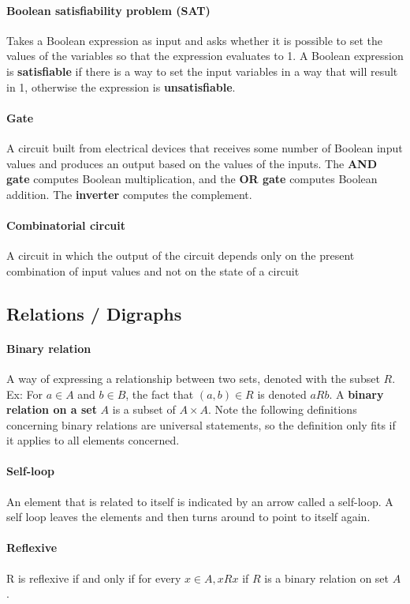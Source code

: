 \documentclass[a4paper]{article}
\begin{document}
\paragraph{Boolean satisfiability problem (SAT)} Takes a Boolean expression as input and asks whether it is possible to set the values of the variables so that the expression evaluates to 1. A Boolean expression is \textbf{satisfiable} if there is a way to set the input variables in a way that will result in 1, otherwise the expression is \textbf{unsatisfiable}.
\paragraph{Gate} A  circuit built from electrical devices that receives some number of Boolean input values and produces an output based on the values of the inputs. The \textbf{AND gate} computes Boolean multiplication, and the \textbf{OR gate} computes Boolean addition. The \textbf{inverter} computes the complement.
\paragraph{Combinatorial circuit} A circuit in which the output of the circuit depends only on the present combination of input values and not on the state of a circuit
\pagebreak
\subsection{Relations / Digraphs}
\paragraph{Binary relation} A way of expressing a relationship between two sets, denoted with the subset $R$. Ex: For $a \in A$ and $b \in B$, the fact that $(a,b) \in R$ is denoted $aRb$. A \textbf{binary relation on a set} $A$ is a subset of $A \times A$. Note the following definitions concerning binary relations are universal statements, so the definition only fits if it applies to all elements concerned.
\paragraph{Self-loop} An element that is related to itself is indicated by an arrow called a self-loop. A self loop leaves the elements and then turns around to point to itself again.
\paragraph{Reflexive} R is reflexive if and only if for every $x \in A, xRx$ if $R$ is a binary relation on set $A$.
\end{document}
